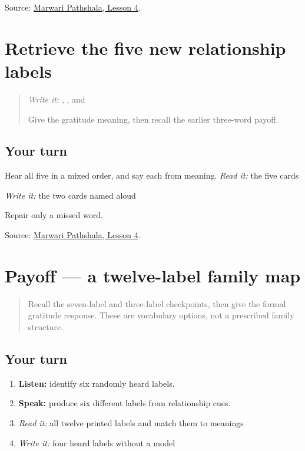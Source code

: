 \begin{tcolorbox}[breakable,colback=teal!4,colframe=teal!35!black,title={Before you move on}]
Source: \href{https://www.marwaripathshala.com/marwari-lesson-4-english}{Marwari Pathshala, Lesson 4}.
\end{tcolorbox}
\section[Practice]{Retrieve the five new relationship labels}

\label{lesson:MW-R09-family-new-five}



\begin{quote}
\emph{Write it:} \textbf{}, \textbf{}, and \textbf{}

Give the gratitude meaning, then recall the earlier three-word payoff.
\end{quote}

\subsection*{Your turn}
Hear all five in a mixed order, and say each from meaning. \emph{Read it:} the five cards

\emph{Write it:} the two cards named aloud

Repair only a missed word.

\begin{tcolorbox}[breakable,colback=teal!4,colframe=teal!35!black,title={Before you move on}]
Source: \href{https://www.marwaripathshala.com/marwari-lesson-4-english}{Marwari Pathshala, Lesson 4}.
\end{tcolorbox}
\section[Practice]{Payoff — a twelve-label family map}

\label{lesson:MW-C09-family-twelve}



\begin{quote}
Recall the seven-label and three-label checkpoints, then give the formal gratitude response. These are vocabulary options, not a prescribed family structure.
\end{quote}

\subsection*{Your turn}
\begin{enumerate}
\raggedright
  \item \textbf{Listen:} identify six randomly heard labels.
  \item \textbf{Speak:} produce six different labels from relationship cues.
  \item \emph{Read it:} all twelve printed labels and match them to meanings
  \item \emph{Write it:} four heard labels without a model
\end{enumerate}

